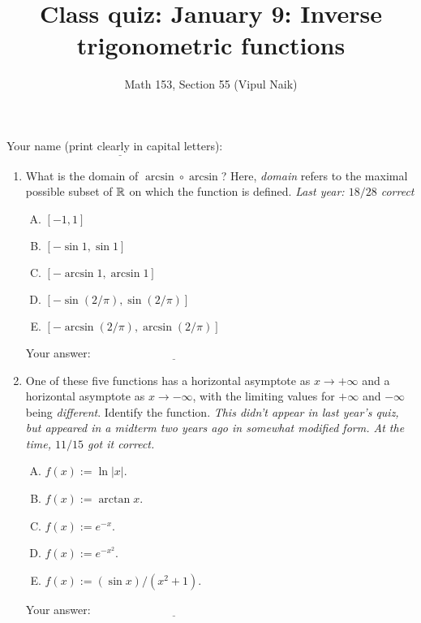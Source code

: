 \documentclass[10pt]{amsart}
\title{Class quiz: January 9: Inverse trigonometric functions}
\author{Math 153, Section 55 (Vipul Naik)}
\begin{document}
\maketitle

Your name (print clearly in capital letters): $\underline{\qquad\qquad\qquad\qquad\qquad\qquad\qquad\qquad\qquad\qquad}$

\begin{enumerate}
\item What is the domain of $\arcsin \circ \arcsin$? Here, {\em
  domain} refers to the maximal possible subset of $\mathbb{R}$ on which the
  function is defined. {\em Last year: $18/28$ correct}

  \begin{enumerate}[(A)]
  \item $[-1,1]$
  \item $[-\sin 1,\sin 1]$
  \item $[-\arcsin 1, \arcsin 1]$
  \item $[-\sin(2/\pi),\sin(2/\pi)]$
  \item $[-\arcsin(2/\pi),\arcsin(2/\pi)]$
  \end{enumerate}

  \vspace{0.1in}
  Your answer: $\underline{\qquad\qquad\qquad\qquad\qquad\qquad\qquad}$
  \vspace{0.4in}

\item One of these five functions has a horizontal asymptote as $x \to
  +\infty$ and a horizontal asymptote as $x \to -\infty$, with the
  limiting values for $+\infty$ and $-\infty$ being {\em
  different}. Identify the function. {\em This didn't appear in last
  year's quiz, but appeared in a midterm two years ago in somewhat
  modified form. At the time, $11/15$ got it correct.}

  \begin{enumerate}[(A)]
  \item $f(x) := \ln|x|$.
  \item $f(x) := \arctan x$.
  \item $f(x) := e^{-x}$.
  \item $f(x) := e^{-x^2}$.
  \item $f(x) := (\sin x)/(x^2 + 1)$.
  \end{enumerate}

  \vspace{0.1in}
  Your answer: $\underline{\qquad\qquad\qquad\qquad\qquad\qquad\qquad}$
  \vspace{0.4in}


\end{enumerate}
\end{document}
